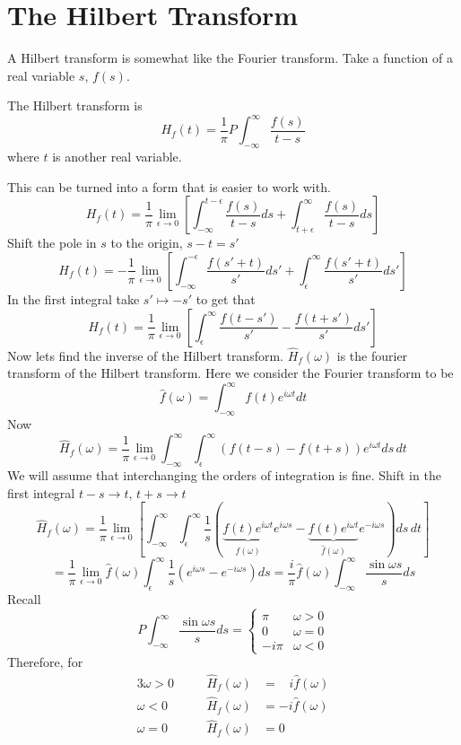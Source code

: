 \documentclass{article}
\newcommand{\improp}{\int_{-\infty}^{\infty} } %
\begin{document}
\section*{The Hilbert Transform}
A Hilbert transform is somewhat like the Fourier transform. Take a function of 
a real variable $s$, $f(s)$. 
\begin{framed}
\noindent The Hilbert transform is 
\[ H_f(t) = \frac{1}{\pi} P \improp \frac{f(s)}{t-s} \]
where $t$ is another real variable.
\end{framed}
\noindent This can be turned into a form that is easier to work with.
\[ H_f(t) = \frac{1}{\pi} \lim_{\epsilon \to 0} \left[
\int_{-\infty}^{t-\epsilon}\frac{f(s)}{t-s} ds + \int^{\infty}_{t+\epsilon} 
\frac{f(s)}{t-s} ds \right] \]
Shift the pole in $s$ to the origin, $s-t = s'$
\[ H_f(t) = -\frac{1}{\pi} \lim_{\epsilon \to 0} \left[
\int_{-\infty}^{-\epsilon}\frac{f(s'+t)}{s'} ds' + \int^{\infty}_{\epsilon} 
\frac{f(s'+t)}{s'} ds' \right] \]
In the first integral take $s' \mapsto -s'$ to get that 
\[ H_f(t) = \frac{1}{\pi} \lim_{\epsilon \to 0} \left[
\int^{\infty}_{\epsilon} \frac{f(t-s')}{s'}
-\frac{f(t+s')}{s'} ds' \right] \]
Now lets find the inverse of the Hilbert transform. $\hat{H}_f(\omega)$ is
the fourier transform of the Hilbert transform. Here we consider the 
Fourier transform to be
\[ \hat{f}(\omega) = \improp f(t) e^{i\omega t} dt \]
Now
\[ \hat{H}_f(\omega) = \frac{1}{\pi} \lim_{\epsilon \to 0}
\improp \int_{\epsilon}^{\infty} (f(t-s)-f(t+s))e^{i\omega t} ds \, dt \]
We will assume that interchanging the orders of integration is fine. Shift
in the first integral $t-s\to t$, $t+s \to t$
\[ \hat{H}_f(\omega) = \frac{1}{\pi} \lim_{\epsilon \to 0} \left[
\improp \int_{\epsilon}^{\infty} \frac{1}{s} ( 
\underbrace{f(t)e^{i\omega t}}_{\hat{f}(\omega)}e^{i\omega s}
- \underbrace{f(t) e^{i\omega t}}_{\hat{f}(\omega)}e^{-i\omega s} 
)ds \, dt \right] \]
\[ = \frac{1}{\pi} \lim_{\epsilon \to 0} \hat{f}(\omega) \int_{\epsilon}^{\infty}
\frac{1}{s} ( e^{i\omega s} - e^{-i \omega s} ) ds  = \frac{i}{\pi} \hat{f}(\omega)
\improp \frac{\sin \omega s}{s} ds \]
Recall
\[P \improp \frac{\sin \omega s}{s} ds = \left\{ \begin{array}{cc}
\pi & \omega > 0 \\
0 & \omega =0 \\
-i\pi & \omega <0 \end{array} \right. \]
Therefore, for
\begin{alignat*}{3}
\omega > 0 & \quad & \hat{H}_f(\omega) &= \;\;\; i \hat{f}(\omega) \\
\omega < 0 & & \hat{H}_f(\omega) &= -i \hat{f}(\omega) \\
\omega =0 & & \hat{H}_f(\omega) &=0
\end{alignat*}
\end{document}
